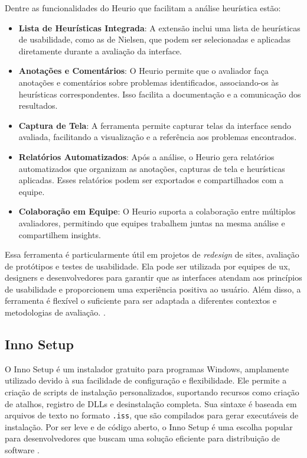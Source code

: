 Dentre as funcionalidades do Heurio que facilitam a análise heurística estão:

\begin{itemize}
    \item \textbf{Lista de Heurísticas Integrada}: A extensão inclui uma lista de heurísticas de usabilidade, como as de Nielsen, que podem ser selecionadas e aplicadas diretamente durante a avaliação da interface.
    
    \item \textbf{Anotações e Comentários}: O Heurio permite que o avaliador faça anotações e comentários sobre problemas identificados, associando-os às heurísticas correspondentes. Isso facilita a documentação e a comunicação dos resultados.
    
    \item \textbf{Captura de Tela}: A ferramenta permite capturar telas da interface sendo avaliada, facilitando a visualização e a referência aos problemas encontrados.
    
    \item \textbf{Relatórios Automatizados}: Após a análise, o Heurio gera relatórios automatizados que organizam as anotações, capturas de tela e heurísticas aplicadas. Esses relatórios podem ser exportados e compartilhados com a equipe.
    
    \item \textbf{Colaboração em Equipe}: O Heurio suporta a colaboração entre múltiplos avaliadores, permitindo que equipes trabalhem juntas na mesma análise e compartilhem insights.
\end{itemize}

Essa ferramenta é particularmente útil em projetos de \textit{redesign} de sites, avaliação de protótipos e testes de usabilidade. Ela pode ser utilizada por equipes de \gls{ux}, designers e desenvolvedores para garantir que as interfaces atendam aos princípios de usabilidade e proporcionem uma experiência positiva ao usuário. Além disso, a ferramenta é flexível o suficiente para ser adaptada a diferentes contextos e metodologias de avaliação. \citep{Heurio}.

\subsection{Inno Setup}
O Inno Setup é um instalador gratuito para programas Windows, amplamente utilizado devido à sua facilidade de configuração e flexibilidade. Ele permite a criação de scripts de instalação personalizados, suportando recursos como criação de atalhos, registro de DLLs e desinstalação completa. Sua sintaxe é baseada em arquivos de texto no formato \texttt{.iss}, que são compilados para gerar executáveis de instalação. Por ser leve e de código aberto, o Inno Setup é uma escolha popular para desenvolvedores que buscam uma solução eficiente para distribuição de software \citep{innosetup}.